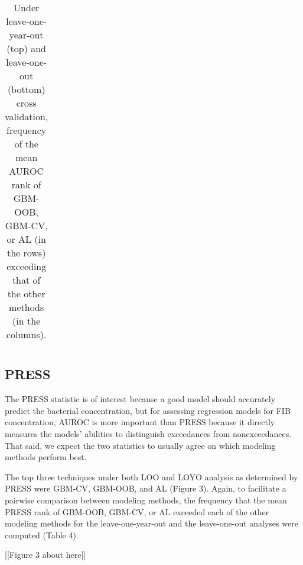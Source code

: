 \documentclass[authoryear,review, 12pt]{elsarticle}
\begin{document}
\begin{table}
{\begin{tabular}{rccccccccccccc}
    \end{tabular}}
    \caption{Under leave-one-year-out (top) and leave-one-out (bottom) cross validation, frequency of the mean AUROC rank of GBM-OOB, GBM-CV, or AL (in the rows) exceeding that of the other methods (in the columns).
    \label{tab:AUROC}}
\end{table}

\subsection{PRESS}\label{press}

The PRESS statistic is of interest because a good model should
accurately predict the bacterial concentration, but for assessing
regression models for FIB concentration, AUROC is more important than
PRESS because it directly measures the models' abilities to distinguish
exceedances from nonexceedances. That said, we expect the two statistics
to usually agree on which modeling methods perform best.

The top three techniques under both LOO and LOYO analysis as determined
by PRESS were GBM-CV, GBM-OOB, and AL (Figure 3). Again, to facilitate a
pairwise comparison between modeling methods, the frequency that the
mean PRESS rank of GBM-OOB, GBM-CV, or AL exceeded each of the other
modeling methods for the leave-one-year-out and the leave-one-out
analyses were computed (Table 4).

[[Figure 3 about here]]
\end{document}
